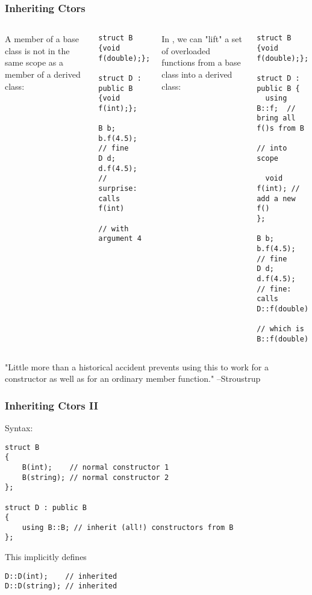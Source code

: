 \begin{frame}[fragile]
\frametitle{Inheriting Ctors}

\begin{columns}[t]
A member of a base class is not in the same scope as a member of a derived class:
{\scriptsize
\begin{verbatim} 
struct B            {void f(double);};

struct D : public B {void f(int);};

B b;   b.f(4.5);  // fine
D d;   d.f(4.5);  // surprise: calls f(int) 
                  // with argument 4
\end{verbatim}
}
\pause{}
In , we can "lift" a set of overloaded functions from a base class into a derived class:
{\scriptsize
\begin{verbatim}
struct B {void f(double);};

struct D : public B {
  using B::f;  // bring all f()s from B 
               // into scope

  void f(int); // add a new f()
};

B b;   b.f(4.5); // fine
D d;   d.f(4.5); // fine: calls D::f(double) 
                 // which is B::f(double)
\end{verbatim}
}
\end{columns}
\pause{}
\vskip 24pt
"Little more than a historical accident prevents using this to work for a constructor as well as for an ordinary member function." --Stroustrup
\end{frame}

\begin{frame}[fragile]
\frametitle{Inheriting Ctors II}

Syntax: 


{\scriptsize
\begin{verbatim}
struct B
{
    B(int);    // normal constructor 1
    B(string); // normal constructor 2
};

struct D : public B
{
    using B::B; // inherit (all!) constructors from B
};
\end{verbatim}
}
This implicitly defines
{\scriptsize
\begin{verbatim}
D::D(int);    // inherited
D::D(string); // inherited
\end{verbatim}
}
\end{frame}

